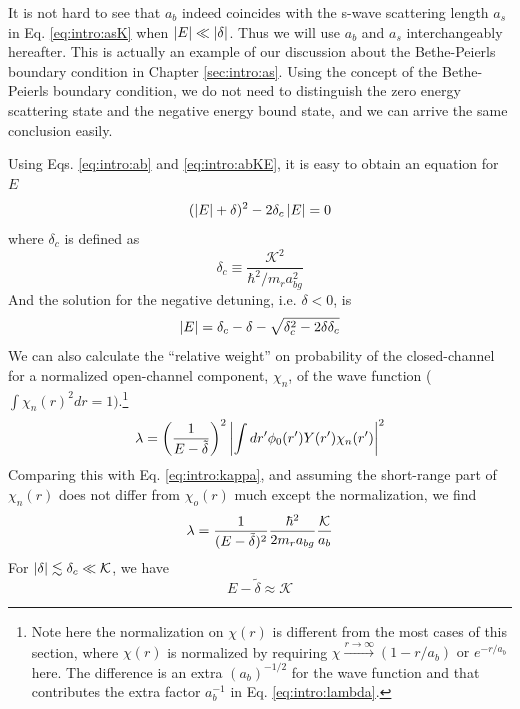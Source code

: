 It is not hard to see that $a_{b}$ indeed  coincides with the s-wave scattering length $a_{s}$ in Eq. \ref{eq:intro:asK} when $\left\lvert{E}\right\rvert\ll\left\lvert{\delta}\right\rvert$. Thus we will use $a_{b}$ and $a_{s}$ interchangeably hereafter. This is actually an example of our discussion about the Bethe-Peierls boundary condition in Chapter \ref{sec:intro:as}. Using the concept of the Bethe-Peierls boundary condition, we do not need to distinguish the zero energy scattering state and the negative energy bound state, and we can arrive the same conclusion easily.  

  Using Eqs. \ref{eq:intro:ab} and \ref{eq:intro:abKE}, it is easy to obtain an equation for $E$
\begin{equation}
(\left\lvert{E}\right\rvert+\delta)^{2}-2\delta_{c}\left\lvert{E}\right\rvert=0 
\end{equation}
where $\delta_{c}$ is defined as 
\begin{equation}\label{eq:intro:deltaC}
\delta_{c}\equiv\frac{\mathcal{K}^{2}}{\hbar^{2}/m_{r}a_{bg}^{2}}
\end{equation}
And the solution for the negative detuning, i.e. $\delta<0$, is
\begin{equation}\label{eq:intro:bindE}
\left\lvert{E}\right\rvert=\delta_{c}-\delta-\sqrt{\delta_{c}^{2}-2\delta\delta_{c}}
\end{equation}
We can also calculate the ``relative weight'' on probability of the closed-channel for a normalized open-channel component, $\chi_{n}$, of the wave function ($\int{}\chi_{n}(r)^{2}dr=1). $\footnote{Note here the normalization on $\chi(r)$ is different from the most cases of this section, where $\chi(r)$ is normalized by  requiring $\chi{}\overset{r\rightarrow\infty}\rightarrow{}(1-r/a_{b})\text{ or }e^{-r/a_{b}} $ here. The difference is an extra $(a_{b})^{-1/2}$ for the wave function and that contributes the extra factor $a_{b}^{-1}$ in Eq. \ref{eq:intro:lambda}.} 
\begin{equation}
\label{eq:intro:closeWeight}
\lambda=\left(\frac{1}{E-\tilde\delta}\right)^{2}\left\lvert{\int{}dr'\phi_{0}(r')Y(r')\chi_{n}(r')}\right\rvert^{2}
\end{equation}
Comparing this with Eq. \ref{eq:intro:kappa}, and assuming the short-range part of $\chi_{n}(r)$ does not differ from $\chi_{o}(r)$ much except the normalization, we  find 
\begin{equation}\label{eq:intro:lambda}
\lambda=\frac{1}{(E-\tilde\delta)^{2}}\frac{\hbar^{2}}{2m_{r}a_{bg}}\frac{\mathcal{K}}{a_{b}}
\end{equation}
For $\left\lvert{\delta}\right\rvert\lesssim\delta_{c}\ll\mathcal{K}$,  we have 
\begin{equation}\label{eq:intro:shiftK}
E-\tilde\delta\approx\mathcal{K}
\end{equation}
